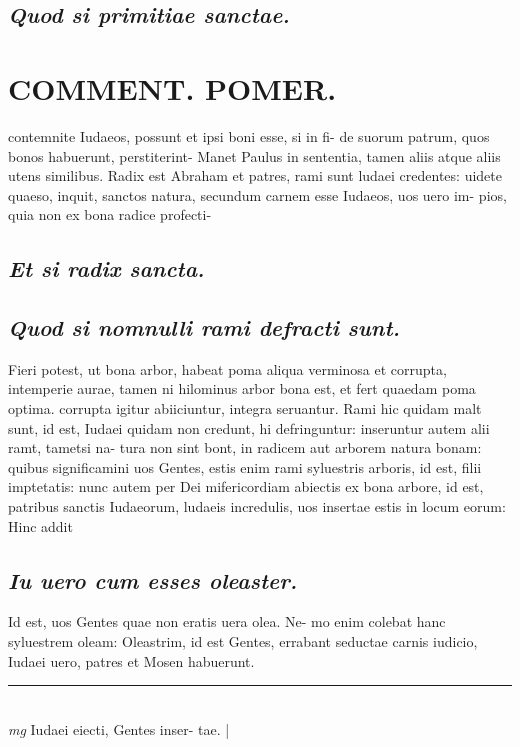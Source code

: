 \documentclass{article}
\begin{document}
\begin{pages}
\subsection*{\textit{Quod si primitiae sanctae. }}\pstart  \pend
\section*{COMMENT. POMER.  }\pstart contemnite Iudaeos, possunt et ipsi boni esse, si in fi- de suorum patrum, quos bonos habuerunt, perstiterint-  \pend\pstart Manet Paulus in sententia, tamen aliis atque aliis utens similibus. Radix est Abraham et patres, rami sunt ludaei credentes: uidete quaeso, inquit, sanctos natura, secundum carnem esse Iudaeos, uos uero im- pios, quia non ex bona radice profecti-  \pend
{}
{}
\subsection*{\textit{Et si radix sancta. }}
{}
\subsection*{\textit{Quod si nomnulli rami defracti sunt. }}\pstart Fieri potest, ut bona arbor, habeat poma aliqua verminosa et corrupta, intemperie aurae, tamen ni hilominus arbor bona est, et fert quaedam poma optima.  corrupta igitur abiiciuntur, integra seruantur. Rami hic quidam malt sunt, id est, Iudaei quidam non credunt, hi defringuntur: inseruntur autem alii ramt, tametsi na- tura non sint bont, in radicem aut arborem natura bonam: quibus significamini uos Gentes, estis enim rami syluestris arboris, id est, filii imptetatis: nunc autem per Dei mifericordiam abiectis ex bona arbore, id est, patribus sanctis Iudaeorum, ludaeis incredulis, uos insertae estis in locum eorum: Hinc addit  \pend
{}
{}
\subsection*{\textit{Iu uero cum esses oleaster. }}\pstart Id est, uos Gentes quae non eratis uera olea. Ne- mo enim colebat hanc syluestrem oleam: Oleastrim, id est Gentes, errabant seductae carnis iudicio, Iudaei uero, patres et Mosen habuerunt.  \pend
\vspace{0.5cm}\noindent
\vspace{0.2cm}\rule{1cm}{0.2pt}\\ 
\hspace{0.2cm}\textit{mg}
\footnotesize Iudaei eiecti, Gentes inser- tae.  
\normalsize| 

\end{pages}
\end{document}
